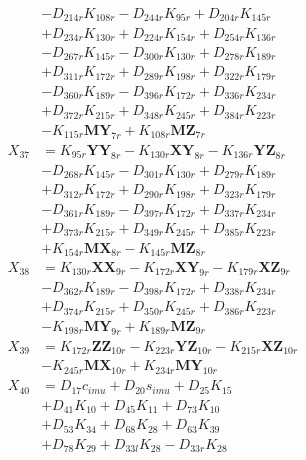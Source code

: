 \begin{multicols}{2}
\begin{align}
&- D_{214r}K_{108r} - D_{244r}K_{95r} + D_{204r}K_{145r}  \nonumber \\
&+ D_{234r}K_{130r} + D_{224r}K_{154r} + D_{254r}K_{136r}  \nonumber \\
&- D_{267r}K_{145r} - D_{300r}K_{130r} + D_{278r}K_{189r}  \nonumber \\
&+ D_{311r}K_{172r} + D_{289r}K_{198r} + D_{322r}K_{179r}  \nonumber \\
&- D_{360r}K_{189r} - D_{396r}K_{172r} + D_{336r}K_{234r}  \nonumber \\
&+ D_{372r}K_{215r} + D_{348r}K_{245r} + D_{384r}K_{223r}  \nonumber \\
&- K_{115r}\mathbf{MY}_{7r} + K_{108r}\mathbf{MZ}_{7r} \nonumber \\
X_{37} &= K_{95r}\mathbf{YY}_{8r} - K_{130r}\mathbf{XY}_{8r} - K_{136r}\mathbf{YZ}_{8r}  \nonumber \\
&- D_{268r}K_{145r} - D_{301r}K_{130r} + D_{279r}K_{189r}  \nonumber \\
&+ D_{312r}K_{172r} + D_{290r}K_{198r} + D_{323r}K_{179r}  \nonumber \\
&- D_{361r}K_{189r} - D_{397r}K_{172r} + D_{337r}K_{234r}  \nonumber \\
&+ D_{373r}K_{215r} + D_{349r}K_{245r} + D_{385r}K_{223r}  \nonumber \\
&+ K_{154r}\mathbf{MX}_{8r} - K_{145r}\mathbf{MZ}_{8r} \nonumber \\
X_{38} &= K_{130r}\mathbf{XX}_{9r} - K_{172r}\mathbf{XY}_{9r} - K_{179r}\mathbf{XZ}_{9r}  \nonumber \\
&- D_{362r}K_{189r} - D_{398r}K_{172r} + D_{338r}K_{234r}  \nonumber \\
&+ D_{374r}K_{215r} + D_{350r}K_{245r} + D_{386r}K_{223r}  \nonumber \\
&- K_{198r}\mathbf{MY}_{9r} + K_{189r}\mathbf{MZ}_{9r} \nonumber \\
X_{39} &= K_{172r}\mathbf{ZZ}_{10r} - K_{223r}\mathbf{YZ}_{10r} - K_{215r}\mathbf{XZ}_{10r}  \nonumber \\
&- K_{245r}\mathbf{MX}_{10r} + K_{234r}\mathbf{MY}_{10r} \nonumber \\
X_{40} &= D_{17}c_{imu} + D_{20}s_{imu} + D_{25}K_{15}  \nonumber \\
&+ D_{41}K_{10} + D_{45}K_{11} + D_{73}K_{10}  \nonumber \\
&+ D_{53}K_{34} + D_{68}K_{28} + D_{63}K_{39}  \nonumber \\
&+ D_{78}K_{29} + D_{33l}K_{28} - D_{33r}K_{28}  \nonumber \\

\end{align}
\end{multicols}

